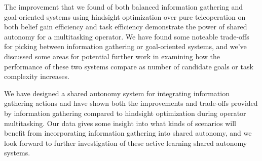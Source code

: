 \documentclass[conference]{IEEEtran}
\begin{document}
The improvement that we found of both balanced information gathering and goal-oriented systems using hindsight optimization over pure teleoperation on both belief gain efficiency and task efficiency demonstrate the power of shared autonomy for a multitasking operator. We have found some noteable trade-offs for picking between information gathering or goal-oriented systems, and we've discussed some areas for potential further work in examining how the performance of these two systems compare as number of candidate goals or task complexity increases.

We have designed a shared autonomy system for integrating information gathering actions and have shown both the improvements and trade-offs provided by information gathering compared to hindsight optimization during operator multitasking. Our data gives some insight into what kinds of scenarios will benefit from incorporating information gathering into shared autonomy, and we look forward to further investigation of these active learning shared autonomy systems.



\end{document}
